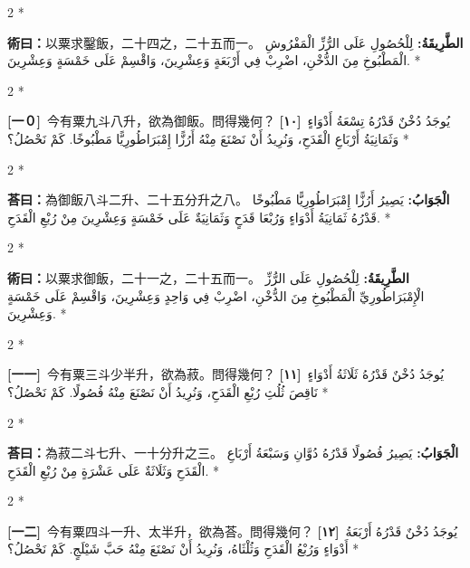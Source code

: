 \documentclass[11pt,a4paper]{article}
\newcommand{\ar}[1]{\arabicfont\beginR #1\endR}
\newcommand{\problemnum}[1]{\textbf{[\ignorespaces#1\unskip]}}
\newenvironment{bilingual}{%
  \begin{paracol}{2}%
  \switchcolumn[0]*%
}{%
  \end{paracol}%
}
\newcommand{\cnline}[1]{\switchcolumn[0]\noindent #1 \switchcolumn[1]}
\newcommand{\arline}[1]{\noindent\ar{#1} \switchcolumn[0]*}
\newenvironment{prob bilingual}{%
  \begin{paracol}{2}%
  \switchcolumn[0]*%
}{%
  \end{paracol}%
  \vspace{0.3em}%
}
\begin{document}
\begin{bilingual}
\cnline{%
\textcolor{methodcolor}{\textbf{術曰：}}以粟求鑿飯，二十四之，二十五而一。
}
\arline{%
\textcolor{methodcolor}{\textbf{الطَّرِيقَةُ:}} لِلْحُصُولِ عَلَى الرُّزِّ الْمَفْرُوشِ الْمَطْبُوخِ مِنَ الدُّخْنِ، اضْرِبْ فِي أَرْبَعَةٍ وَعِشْرِينَ، وَاقْسِمْ عَلَى خَمْسَةٍ وَعِشْرِينَ.
}
\end{bilingual}

\begin{bilingual}
\cnline{\problemnum{一０}\, 今有粟九斗八升，欲為御飯。問得幾何？}
\arline{\problemnum{١٠}\, يُوجَدُ دُخْنٌ قَدْرُهُ تِسْعَةُ أَدْوَاءٍ وَثَمَانِيَةُ أَرْبَاعِ الْقَدَحِ، وَنُرِيدُ أَنْ نَصْنَعَ مِنْهُ أَرُزًّا إِمْبَرَاطُورِيًّا مَطْبُوخًا. كَمْ نَحْصُلُ؟}
\end{bilingual}

\begin{bilingual}
\cnline{\textcolor{answercolor}{\textbf{荅曰：}}為御飯八斗二升、二十五分升之八。}
\arline{\textcolor{answercolor}{\textbf{الْجَوَابُ:}} يَصِيرُ أَرُزًّا إِمْبَرَاطُورِيًّا مَطْبُوخًا قَدْرُهُ ثَمَانِيَةُ أَدْوَاءٍ وَرُبْعَا قَدَحٍ وَثَمَانِيَةٌ عَلَى خَمْسَةٍ وَعِشْرِينَ مِنْ رُبْعِ الْقَدَحِ.}
\end{bilingual}

\begin{bilingual}
\cnline{%
\textcolor{methodcolor}{\textbf{術曰：}}以粟求御飯，二十一之，二十五而一。
}
\arline{%
\textcolor{methodcolor}{\textbf{الطَّرِيقَةُ:}} لِلْحُصُولِ عَلَى الرُّزِّ الْإِمْبَرَاطُورِيِّ الْمَطْبُوخِ مِنَ الدُّخْنِ، اضْرِبْ فِي وَاحِدٍ وَعِشْرِينَ، وَاقْسِمْ عَلَى خَمْسَةٍ وَعِشْرِينَ.
}
\end{bilingual}

\begin{bilingual}
\cnline{\problemnum{一一}\, 今有粟三斗少半升，欲為菽。問得幾何？}
\arline{\problemnum{١١}\, يُوجَدُ دُخْنٌ قَدْرُهُ ثَلَاثَةُ أَدْوَاءٍ نَاقِصَ ثُلُثِ رُبْعِ الْقَدَحِ، وَنُرِيدُ أَنْ نَصْنَعَ مِنْهُ فُصُولًا. كَمْ نَحْصُلُ؟}
\end{bilingual}

\begin{bilingual}
\cnline{\textcolor{answercolor}{\textbf{荅曰：}}為菽二斗七升、一十分升之三。}
\arline{\textcolor{answercolor}{\textbf{الْجَوَابُ:}} يَصِيرُ فُصُولًا قَدْرُهُ دُوَّانِ وَسَبْعَةُ أَرْبَاعِ الْقَدَحِ وَثَلَاثَةٌ عَلَى عَشْرَةٍ مِنْ رُبْعِ الْقَدَحِ.}
\end{bilingual}

\begin{bilingual}
\cnline{\problemnum{一二}\, 今有粟四斗一升、太半升，欲為荅。問得幾何？}
\arline{\problemnum{١٢}\, يُوجَدُ دُخْنٌ قَدْرُهُ أَرْبَعَةُ أَدْوَاءٍ وَرُبْعُ الْقَدَحِ وَثُلْثَاهُ، وَنُرِيدُ أَنْ نَصْنَعَ مِنْهُ حَبَّ شَيْلَجٍ. كَمْ نَحْصُلُ؟}
\end{bilingual}
\end{document}
